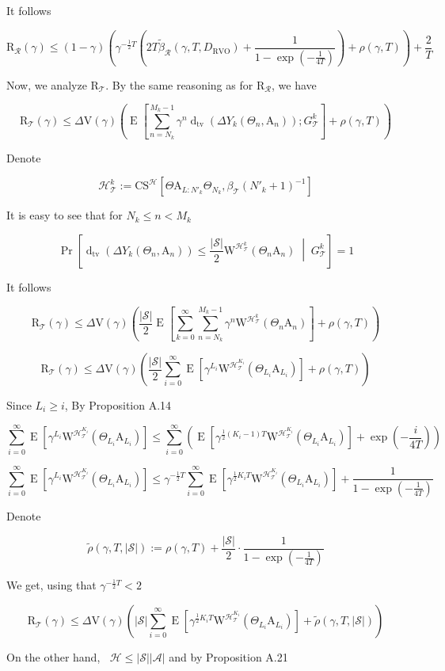 \documentclass[a4paper]{article}
\newcommand{\AP}[1]{\left(#1\right)}
\newcommand{\AB}[1]{\left[#1\right]}
\newcommand{\ABM}[2]{\left[#1\;\middle\vert\;#2\right]}
\newcommand{\Abs}[1]{\left\vert #1 \right\vert}
\newcommand{\CPb}[2]{\operatorname{Pr}\ABM{#1}{#2}}
\newcommand{\E}[1]{\operatorname{E}\AB{#1}}
\newcommand{\Dtva}[1]{\operatorname{d}_{\text{tv}}\AP{#1}}
\newcommand{\St}{\mathcal{S}}
\newcommand{\A}{\mathcal{A}}
\newcommand{\R}{\mathcal{R}}
\newcommand{\T}{\mathcal{T}}
\newcommand{\Hy}{\mathcal{H}}
\DeclareMathOperator{\RVO}{\dim_{RVO}}
\newcommand{\DRVO}{D_{\mathrm{RVO}}}
\newcommand{\V}{\mathrm{V}}
\newcommand{\Reg}{\mathrm{R}}
\newcommand{\SHy}{Y}
\newcommand{\AT}{\mathrm{A}}
\newcommand{\ET}{N}
\newcommand{\IT}{M}
\newcommand{\CSE}{G}
\newcommand{\CS}{\mathrm{CS}}
\newcommand{\W}{\mathrm{W}}
\begin{document}
It follows

$$\Reg_\R(\gamma)\leq(1-\gamma)\AP{\gamma^{-\frac{1}{2}T}\AP{2T\tilde{\beta}_\R(\gamma,T,\DRVO)+\frac{1}{1-\exp\AP{-\frac{1}{4T}}}}+\rho(\gamma,T)}+\frac{2}{T}$$

Now, we analyze $\Reg_{\T}$. By the same reasoning as for $\Reg_\R$, we have

$$\Reg_\T(\gamma)\leq\Delta\V(\gamma)\AP{\E{\sum_{n=\ET_k}^{\IT_k-1}\gamma^{n}\Dtva{\Delta\SHy_k\AP{\Theta_n,\AT_n}};\CSE_\T^k}+\rho(\gamma,T)}$$

Denote

$$\Hy_\T^k:=\CS^\Hy\AB{\Theta\AT_{L:N'_k}\Theta_{N_k},\beta_\T\AP{N'_k+1}^{-1}}$$

It is easy to see that for $N_k\leq n<M_k$

$$\CPb{\Dtva{\Delta\SHy_k\AP{\Theta_n,\AT_n}}\leq\frac{\Abs{\St}}{2}\W^{\Hy_\T^k}\AP{\Theta_n\AT_n}}{\CSE_\T^k}=1$$

It follows

$$\Reg_\T(\gamma)\leq\Delta\V(\gamma)\AP{\frac{\Abs{\St}}{2}\E{\sum_{k=0}^\infty\sum_{n=\ET_k}^{\IT_k-1}\gamma^{n}\W^{\Hy_\T^k}\AP{\Theta_n\AT_n}}+\rho(\gamma,T)}$$

$$\Reg_\T(\gamma)\leq\Delta\V(\gamma)\AP{\frac{\Abs{\St}}{2}\sum_{i=0}^\infty\E{\gamma^{L_i}\W^{\Hy_\T^{K_i}}\AP{\Theta_{L_i}\AT_{L_i}}}+\rho(\gamma,T)}$$

Since $L_i\geq i$, By Proposition A.14

$$\sum_{i=0}^\infty\E{\gamma^{L_i}\W^{\Hy_\T^{K_i}}\AP{\Theta_{L_i}\AT_{L_i}}}\leq\sum_{i=0}^\infty\AP{\E{\gamma^{\frac{1}{2}\AP{K_i-1}T}\W^{\Hy_\T^{K_i}}\AP{\Theta_{L_i}\AT_{L_i}}}+\exp\AP{-\frac{i}{4T}}}$$

$$\sum_{i=0}^\infty\E{\gamma^{L_i}\W^{\Hy_\T^{K_i}}\AP{\Theta_{L_i}\AT_{L_i}}}\leq\gamma^{-\frac{1}{2}T}\sum_{i=0}^\infty\E{\gamma^{\frac{1}{2}K_iT}\W^{\Hy_\T^{K_i}}\AP{\Theta_{L_i}\AT_{L_i}}}+\frac{1}{1-\exp\AP{-\frac{1}{4T}}}$$

Denote

$$\tilde{\rho}\AP{\gamma,T,\Abs{\St}}:=\rho(\gamma,T)+\frac{\Abs{\St}}{2}\cdot\frac{1}{1-\exp\AP{-\frac{1}{4T}}}$$

We get, using that $\gamma^{-\frac{1}{2}T}<2$

$$\Reg_\T(\gamma)\leq\Delta\V(\gamma)\AP{\Abs{\St}\sum_{i=0}^\infty\E{\gamma^{\frac{1}{2}K_iT}\W^{\Hy_\T^{K_i}}\AP{\Theta_{L_i}\AT_{L_i}}}+\tilde{\rho}\AP{\gamma,T,\Abs{\St}}}$$

On the other hand, $\RVO\Hy\leq\Abs{\St}\Abs{\A}$ and by Proposition A.21
\end{document}
